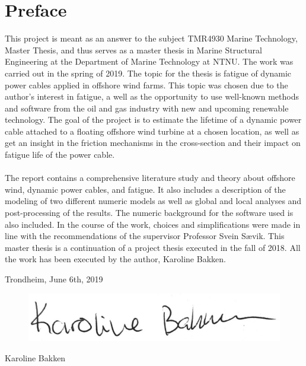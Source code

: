 \hypersetup{pageanchor=true}
%
\chapter*{Preface}
This project is meant as an answer to the subject TMR4930 Marine Technology, Master Thesis, and thus serves as a master thesis in Marine Structural Engineering at the Department of Marine Technology at NTNU. The work was carried out in the spring of 2019. \newline
\newline
The topic for the thesis is fatigue of dynamic power cables applied in offshore wind farms. This topic was chosen due to the author's interest in fatigue, a well as the opportunity to use well-known methods and software from the oil and gas industry with new and upcoming renewable technology. The goal of the project is to estimate the lifetime of a dynamic power cable attached to a floating offshore wind turbine at a chosen location, as well as get an insight in the friction mechanisms in the cross-section and their impact on fatigue life of the power cable. \\\\ The report contains a comprehensive literature study and theory about offshore wind, dynamic power cables, and fatigue. It also includes a description of the modeling of two different numeric models as well as global and local analyses and post-processing of the results. The numeric background for the software used is also included. In the course of the work, choices and simplifications were made in line with the recommendations of the supervisor Professor Svein Sævik. \newline
\newline
This master thesis is a continuation of a project thesis executed in the fall of 2018. All the work has been executed by the author, Karoline Bakken. 
\newline
\newline
\newline
\newline
\newline
\newline
\begin{center}
    Trondheim, June 6th, 2019
    \end{center}
\begin{figure}[H]
\centering
\includegraphics[scale=0.5]{figures/sign}
\end{figure}
\begin{center}
Karoline Bakken
\end{center}
